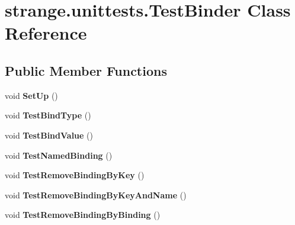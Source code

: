 \hypertarget{classstrange_1_1unittests_1_1_test_binder}{\section{strange.\-unittests.\-Test\-Binder Class Reference}
\label{classstrange_1_1unittests_1_1_test_binder}
}
\subsection*{Public Member Functions}
\begin{DoxyCompactItemize}
\item 
\hypertarget{classstrange_1_1unittests_1_1_test_binder_a24ede10a057afde55e815b133037816a}{void {\bfseries Set\-Up} ()}\label{classstrange_1_1unittests_1_1_test_binder_a24ede10a057afde55e815b133037816a}

\item 
\hypertarget{classstrange_1_1unittests_1_1_test_binder_a5ea5392b4177c4be33e0a16a6ed85a91}{void {\bfseries Test\-Bind\-Type} ()}\label{classstrange_1_1unittests_1_1_test_binder_a5ea5392b4177c4be33e0a16a6ed85a91}

\item 
\hypertarget{classstrange_1_1unittests_1_1_test_binder_affb821b48cb744e91ec34c3d12a1d263}{void {\bfseries Test\-Bind\-Value} ()}\label{classstrange_1_1unittests_1_1_test_binder_affb821b48cb744e91ec34c3d12a1d263}

\item 
\hypertarget{classstrange_1_1unittests_1_1_test_binder_a6731e2a86e9ced9f385a9affa4e4c4b5}{void {\bfseries Test\-Named\-Binding} ()}\label{classstrange_1_1unittests_1_1_test_binder_a6731e2a86e9ced9f385a9affa4e4c4b5}

\item 
\hypertarget{classstrange_1_1unittests_1_1_test_binder_afff43ff1481d482acebff7d1fd05b4f0}{void {\bfseries Test\-Remove\-Binding\-By\-Key} ()}\label{classstrange_1_1unittests_1_1_test_binder_afff43ff1481d482acebff7d1fd05b4f0}

\item 
\hypertarget{classstrange_1_1unittests_1_1_test_binder_a20a16dc789247ecc5981c85f6f569942}{void {\bfseries Test\-Remove\-Binding\-By\-Key\-And\-Name} ()}\label{classstrange_1_1unittests_1_1_test_binder_a20a16dc789247ecc5981c85f6f569942}

\item 
\hypertarget{classstrange_1_1unittests_1_1_test_binder_a655c48ab8c515e32de057b8f0dfc7ea3}{void {\bfseries Test\-Remove\-Binding\-By\-Binding} ()}\label{classstrange_1_1unittests_1_1_test_binder_a655c48ab8c515e32de057b8f0dfc7ea3}


\end{DoxyCompactItemize}
